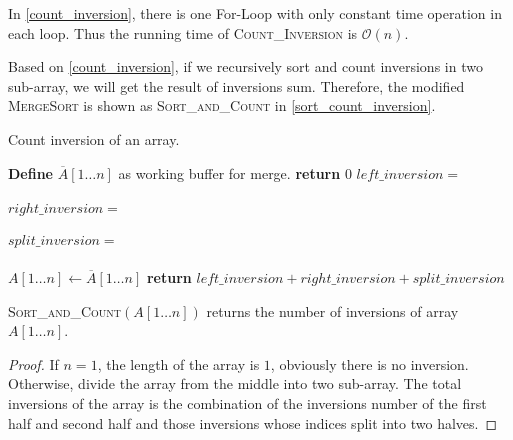 \begin{homeworkProblem}[Inversions]
In \cref{count_inversion}, there is one For-Loop with only constant time operation
in each loop. Thus the running time of \textsc{Count\_Inversion} is $\mathcal{O}(n)$.

Based on \cref{count_inversion}, if we recursively sort and count inversions in two
sub-array, we will get the result of inversions sum. Therefore, the modified
\textsc{MergeSort} is shown as \textsc{Sort\_and\_Count} in \cref{sort_count_inversion}.

\begin{algorithm}[H]
    \caption{Count inversion of an array.} \label{sort_count_inversion}
    \begin{algorithmic}[1]
            \State \textbf{Define} $\overline{A}[1 \ldots n]$ as working buffer for merge.
             
                \State \textbf{return} 0
            \Else {}
                \State $left\_inversion=$
                    \\\\
                \State $right\_inversion=$
                    \\\\
                \State $split\_inversion=$\Call{Count\_Inversions}{$\overline{A}[1 \ldots n]$, $A[1 \ldots \lfloor n/2 \rfloor$, $A[\lfloor n/2 \rfloor + 1 \ldots n]$}
                    \\\\
                \State $A[1 \ldots n] \leftarrow \overline{A}[1 \ldots n]$
            \EndIf
        \State \textbf{return } $left\_inversion + right\_inversion + split\_inversion$
        \EndProcedure
    \end{algorithmic}
\end{algorithm}


\Claim \textsc{Sort\_and\_Count}$(A[1 \ldots n])$ returns the number of inversions of array $A[1 \ldots n]$.

\begin{proof}
    If $n = 1$, the length of the array is $1$, obviously there is no inversion.
    Otherwise, divide the array from the middle into two sub-array. The total
    inversions of the array is the combination of the inversions number of the
    first half and second half and those inversions whose indices split into two halves.


\end{proof}
\end{homeworkProblem}
